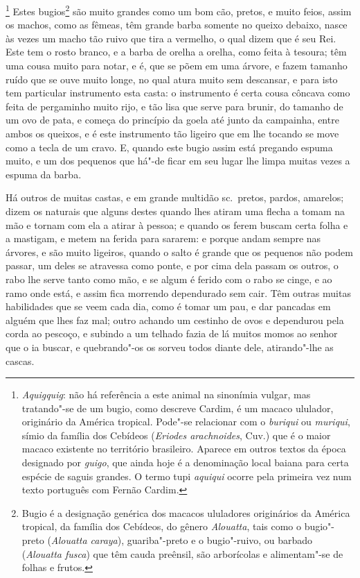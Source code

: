 \footnote{ \textit{Aquigquig}: não há
referência a este animal na sinonímia vulgar, mas tratando"-se de um
bugio, como descreve Cardim, é um macaco ululador, originário da
América tropical. Pode"-se relacionar com o \textit{buriqui} ou
\textit{muriqui}, símio da família dos Cebídeos (\textit{Eriodes 
arachnoides}, Cuv.) que é o maior macaco existente no território
brasileiro. Aparece em outros textos da época designado por
\textit{guigo}, que ainda hoje é a denominação local baiana para certa
espécie de saguis grandes. O termo tupi \textit{aquiqui} ocorre pela
primeira vez num texto português com Fernão Cardim.} Estes
bugios\footnote{ Bugio é a designação genérica dos macacos
ululadores originários da América tropical, da família dos Cebídeos, 
do gênero \textit{Alouatta}, tais como o bugio"-preto (\textit{Alouatta
caraya}), guariba"-preto e o bugio"-ruivo, ou barbado 
(\textit{Alouatta fusca}) que têm cauda preênsil, são arborícolas e
alimentam"-se de folhas e frutos.} são muito grandes como um bom cão,
pretos, e muito feios, assim os machos, como as fêmeas, têm grande
barba somente no queixo debaixo, nasce às vezes um macho tão ruivo que
tira a vermelho, o qual dizem que é seu Rei. Este tem o rosto branco, e
a barba de orelha a orelha, como feita à tesoura; têm uma cousa muito
para notar, e é, que se põem em uma árvore, e fazem tamanho ruído que
se ouve muito longe, no qual atura muito sem descansar, e para isto tem
particular instrumento esta casta: o instrumento é certa cousa côncava
como feita de pergaminho muito rijo, e tão lisa que serve para brunir,
do tamanho de um ovo de pata, e começa do princípio da goela até junto
da campainha, entre ambos os queixos, e é este instrumento tão ligeiro
que em lhe tocando se move como a tecla de um cravo. E, quando este
bugio assim está pregando espuma muito, e um dos pequenos que há"-de
ficar em seu lugar lhe limpa muitas vezes a espuma da barba.

 Há outros de muitas castas, e em grande multidão sc.~pretos, pardos,
amarelos; dizem os naturais que alguns destes quando lhes atiram uma
flecha a tomam na mão e tornam com ela a atirar à pessoa; e quando os
ferem buscam certa folha e a mastigam, e metem na ferida para sararem:
e porque andam sempre nas árvores, e são muito ligeiros, quando o salto
é grande que os pequenos não podem passar, um deles se atravessa como
ponte, e por cima dela passam os outros, o rabo lhe serve tanto como
mão, e se algum é ferido com o rabo se cinge, e ao ramo onde está, e
assim fica morrendo dependurado sem cair. Têm outras muitas habilidades
que se veem cada dia, como é tomar um pau, e dar pancadas em alguém que
lhes faz mal; outro achando um cestinho de ovos e dependurou pela corda
ao pescoço, e subindo a um telhado fazia de lá muitos momos ao senhor
que o ia buscar, e quebrando"-os os sorveu todos diante dele,
atirando"-lhe as cascas. 

